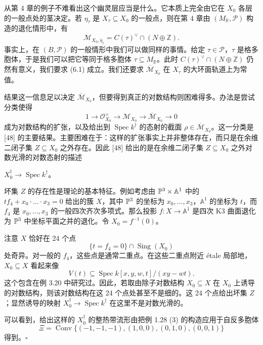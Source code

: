 从第 4 章的例子不难看出这个幽灵层应当是什么。它本质上完全由它在 $X_0$ 各层的一般点处的茎决定。若 $\eta_\tau$ 是 $X_\tau\subseteq X_0$ 的一般点，则在第 4 章由 $(M_{\mathbb{R}},\mathcal{P})$ 构造的退化情形中，有
\begin{equation}
  \mathcal{M}_{X_0,\bar\eta_\tau}=C(\tau)^{\vee}\cap(N\oplus\mathbb{Z}). \tag{6.1}
\end{equation}
事实上，在 $(B,\mathcal{P})$ 的一般情形中我们可以做同样的事情。给定 $\tau\in\mathcal{P}$，$\tau$ 是格多胞体，于是我们可以把它等同于格多胞体 $\tau\subseteq M_{\mathbb{R}}$。此时 $C(\tau)^{\vee}\cap(N\oplus\mathbb{Z})$ 仍然有意义，我们要求 (6.1) 成立。我们还要求 $\overline{\mathcal{M}}_{X_0}$ 在 $X_\tau$ 的大环面轨道上为常值。

结果这一信息足以决定 $\overline{\mathcal{M}}_{X_0}$，但要得到真正的对数结构则困难得多。办法是尝试分类使得
\[
  1\to\mathcal{O}_{X_0}^{\times}\to\mathcal{M}_{X_0}\to\overline{\mathcal{M}}_{X_0}\to0
\]
成为对数结构的扩张，以及给出到 $\operatorname{Spec} k^{\dagger}$ 的态射的截面 $\rho\in\overline{\mathcal{M}}_{X_0}$。这一分类是 [48] 的主要结果。主要困难在于：这样的扩张事实上并非整体存在，而只是在余维二闭子集 $Z\subseteq X_0$ 之外存在。因此 [48] 给出的是在余维二闭子集 $Z\subseteq X_0$ 之外对数光滑的对数态射的描述


$X_0^{\dagger}\to\operatorname{Spec} k^{\dagger}$。

\begin{example}
坏集 $Z$ 的存在性是理论的基本特征。例如考虑由 $\mathbb{P}^3\times\mathbb{A}^1$ 中的 $tf_4+x_0\cdot\ldots\cdot x_3=0$ 给出的簇 $X$，其中 $\mathbb{P}^3$ 的坐标为 $x_0,\dots,x_3$，$\mathbb{A}^1$ 的坐标为 $t$，而 $f_4$ 是 $x_0,\dots,x_3$ 的一般四次齐次多项式。那么投影 $f:X\to\mathbb{A}^1$ 是四次 K3 曲面退化为 $\mathbb{P}^3$ 中坐标平面之并的退化。令 $X_0=f^{-1}(0)$。

注意 $X$ 恰好在 24 个点
\[
  \{t=f_4=0\}\cap\operatorname{Sing}(X_0)
\]
处奇异。对一般的 $f_4$，这些点是通常二重点。在这些二重点附近 étale 局部地，$X_0\subseteq X$ 看起来像
\[
  V(t)\subseteq\operatorname{Spec} k[x,y,w,t]/(xy-wt).
\]
这个包含在例 3.20 中研究过。因此，若取由除子对数结构 $X_0\subseteq X$ 在 $X_0$ 上诱导的对数结构，则该对数结构在这 24 个点处甚至不是细的。这 24 个点给出坏集 $Z$；显然诱导的映射 $X_0^{\dagger}\to\operatorname{Spec} k^{\dagger}$ 在这里不是对数光滑的。

可以看到，给出这样的 $X_0^{\dagger}$ 的整热带流形由把例 1.28 (3) 的构造应用于自反多胞体
\[
  \Xi=\operatorname{Conv}\{(-1,-1,-1),(1,0,0),(0,1,0),(0,0,1)\}
\]
得到。\hfill$\square$
\end{example}


